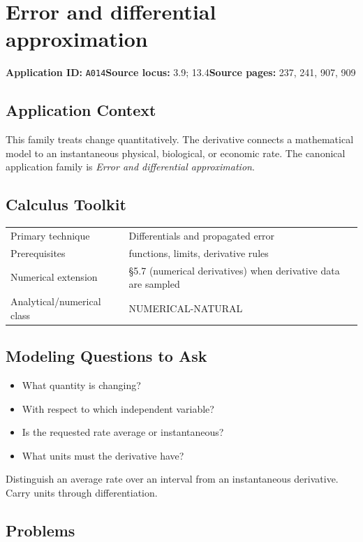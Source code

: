\documentclass[11pt]{book}
\newcommand{\pid}[1]{\texttt{#1}}
\begin{document}
\chapter{Error and differential approximation}\label{app:A014}
\textbf{Application ID:} \pid{A014}\quad \textbf{Source locus:} 3.9; 13.4\quad \textbf{Source pages:} 237, 241, 907, 909
\section*{Application Context}
This family treats change quantitatively. The derivative connects a mathematical model to an instantaneous physical, biological, or economic rate. The canonical application family is \emph{Error and differential approximation}.
\section*{Calculus Toolkit}
\begin{tabularx}{\textwidth}{@{}lX@{}}\toprule
Primary technique & Differentials and propagated error \\
Prerequisites & functions, limits, derivative rules \\
Numerical extension & §5.7 (numerical derivatives) when derivative data are sampled \\
Analytical/numerical class & NUMERICAL-NATURAL \\
\bottomrule\end{tabularx}
\section*{Modeling Questions to Ask}\begin{itemize}
\item What quantity is changing?
\item With respect to which independent variable?
\item Is the requested rate average or instantaneous?
\item What units must the derivative have?
\end{itemize}
\begin{errorbox}Distinguish an average rate over an interval from an instantaneous derivative. Carry units through differentiation.\end{errorbox}
\section*{Problems}
\end{document}
